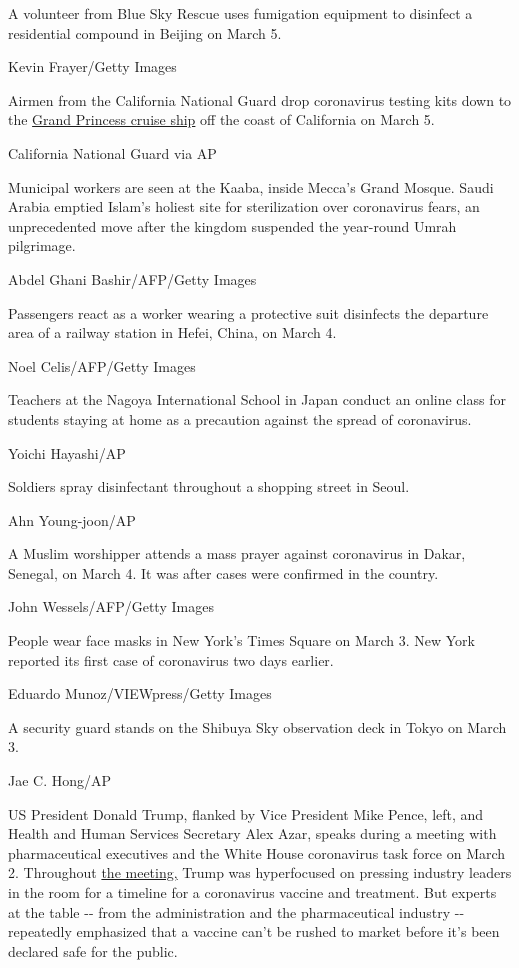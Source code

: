 A volunteer from Blue Sky Rescue uses fumigation equipment to disinfect
a residential compound in Beijing on March 5.

Kevin Frayer/Getty Images

Airmen from the California National Guard drop coronavirus testing kits
down to the
\href{https://www.cnn.com/2020/03/05/health/california-coronavirus-cruise-ship-thursday/index.html}{Grand
Princess cruise ship} off the coast of California on March 5.

California National Guard via AP

Municipal workers are seen at the Kaaba, inside Mecca's Grand Mosque.
Saudi Arabia emptied Islam's holiest site for sterilization over
coronavirus fears, an unprecedented move after the kingdom suspended the
year-round Umrah pilgrimage.

Abdel Ghani Bashir/AFP/Getty Images

Passengers react as a worker wearing a protective suit disinfects the
departure area of a railway station in Hefei, China, on March 4.

Noel Celis/AFP/Getty Images

Teachers at the Nagoya International School in Japan conduct an online
class for students staying at home as a precaution against the spread of
coronavirus.

Yoichi Hayashi/AP

Soldiers spray disinfectant throughout a shopping street in Seoul.

Ahn Young-joon/AP

A Muslim worshipper attends a mass prayer against coronavirus in Dakar,
Senegal, on March 4. It was after cases were confirmed in the country.

John Wessels/AFP/Getty Images

People wear face masks in New York's Times Square on March 3. New York
reported its first case of coronavirus two days earlier.

Eduardo Munoz/VIEWpress/Getty Images

A security guard stands on the Shibuya Sky observation deck in Tokyo on
March 3.

Jae C. Hong/AP

US President Donald Trump, flanked by Vice President Mike Pence, left,
and Health and Human Services Secretary Alex Azar, speaks during a
meeting with pharmaceutical executives and the White House coronavirus
task force on March 2. Throughout
\href{https://www.cnn.com/2020/03/02/politics/donald-trump-coronavirus-vaccine-push-back/index.html}{the
meeting,} Trump was hyperfocused on pressing industry leaders in the
room for a timeline for a coronavirus vaccine and treatment. But experts
at the table -\/- from the administration and the pharmaceutical
industry -\/- repeatedly emphasized that a vaccine can't be rushed to
market before it's been declared safe for the public.

